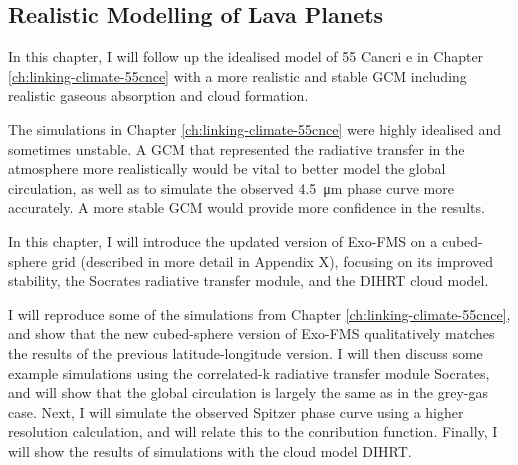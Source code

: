 \begin{SingleSpace}
\chapter{Realistic Modelling of Lava Planets}\label{ch:clouds-lava-planets}
\vspace{0.5cm}
\end{SingleSpace}
\vspace{0.5cm}











In this chapter, I will follow up the idealised model of 55 Cancri e in Chapter \ref{ch:linking-climate-55cnce} with a more realistic and stable GCM including realistic gaseous absorption and cloud formation.

The simulations in Chapter \ref{ch:linking-climate-55cnce} were highly idealised and sometimes unstable. A GCM that represented the radiative transfer in the atmosphere more realistically would be vital to better model the global circulation, as well as to simulate the observed \SI{4.5}{\micro\metre} phase curve more accurately. A more stable GCM would provide more confidence in the results.

In this chapter, I will introduce the updated version of Exo-FMS on a cubed-sphere grid (described in more detail in Appendix X), focusing on its improved stability, the Socrates radiative transfer module, and the DIHRT cloud model.

I will reproduce some of the simulations from Chapter \ref{ch:linking-climate-55cnce}, and show that the new cubed-sphere version of Exo-FMS qualitatively matches the results of the previous latitude-longitude version. I will then discuss some example simulations using the correlated-k radiative transfer module Socrates, and will show that the global circulation is largely the same as in the grey-gas case. Next, I will simulate the observed Spitzer phase curve using a higher resolution calculation, and will relate this to the conribution function. Finally, I will show the results of simulations with the cloud model DIHRT.

